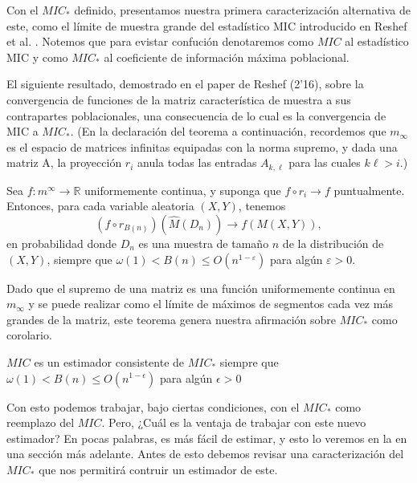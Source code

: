         Con el $MIC_*$ definido, presentamos nuestra primera caracterizaci\'on alternativa de este, como el l\'imite de muestra grande del estad\'istico MIC introducido en Reshef et al. \cite{Reshef2011}. Notemos que para evistar confuci\'on denotaremos como $MIC$ al estad\'istico MIC y como $MIC_*$ al coeficiente de informaci\'on m\'axima poblacional.
    
        El siguiente resultado, demostrado en el paper de Reshef (2'16)\cite{Reshef2016}, sobre la convergencia de funciones de la matriz caracter\'istica de muestra a sus contrapartes poblacionales, una consecuencia de lo cual es la convergencia de MIC a $MIC_*$. (En la declaraci\'on del teorema a continuaci\'on, recordemos que $m_\infty$ es el espacio de matrices infinitas equipadas con la norma supremo, y dada una matriz A, la proyecci\'on $r_i$ anula todas las entradas $A_{k, \ell}$ para las cuales $k\ell > i.$)
    
        \begin{thm}
            Sea $f: m^{\infty} \rightarrow \mathbb{R}$ uniformemente continua, y suponga que $f \circ r_i \rightarrow f$ puntualmente. Entonces, para cada variable aleatoria $(X, Y)$, tenemos
            $$
            \left(f \circ r_{B(n)}\right)\left(\widehat{M}\left(D_n\right)\right) \rightarrow f(M(X, Y)),
            $$
            en probabilidad donde $D_n$ es una muestra de tama\~no $n$ de la distribuci\'on de $(X, Y)$, siempre que $\omega(1)<B(n) \leq O\left(n^{1-\varepsilon}\right)$ para alg\'un $\varepsilon>0$.
        \end{thm}
    
        Dado que el supremo de una matriz es una funci\'on uniformemente continua en $m_\infty$ y se puede realizar como el l\'imite de m\'aximos de segmentos cada vez m\'as grandes de la matriz, este teorema genera nuestra afirmaci\'on sobre $MIC_*$ como corolario.
    
        \begin{cor}
            $MIC$ es un estimador consistente de $MIC_*$ siempre que $\omega(1) < B(n) \leq O(n^{1-\epsilon})$ para alg\'un $\epsilon > 0$
        \end{cor}
    
        Con esto podemos trabajar, bajo ciertas condiciones, con el $MIC_*$ como reemplazo del $MIC$. Pero, ¿Cu\'al es la ventaja de trabajar con este nuevo estimador? En pocas palabras, es m\'as f\'acil de estimar, y esto lo veremos en la en una secci\'on m\'as adelante. Antes de esto debemos revisar una caracterizaci\'on del $MIC_*$ que nos permitir\'a contruir un estimador de este.
    
